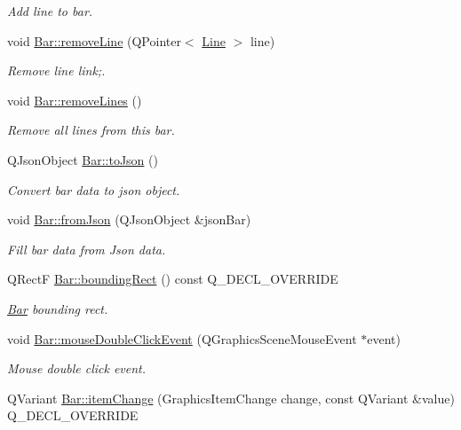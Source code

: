 \begin{DoxyCompactItemize}
\begin{DoxyCompactList}\small\item\em Add line to bar. \end{DoxyCompactList}\item 
void \hyperlink{group___models_gaec9faaf687415c27cd1d0527e1b94504}{Bar\+::remove\+Line} (Q\+Pointer$<$ \hyperlink{class_line}{Line} $>$ line)
\begin{DoxyCompactList}\small\item\em Remove line link;. \end{DoxyCompactList}\item 
void \hyperlink{group___models_ga4ea1a2074cb45968d80d6add571884a4}{Bar\+::remove\+Lines} ()
\begin{DoxyCompactList}\small\item\em Remove all lines from this bar. \end{DoxyCompactList}\item 
Q\+Json\+Object \hyperlink{group___models_ga3eb84c42b687db6cd98e11b8bd38c86e}{Bar\+::to\+Json} ()
\begin{DoxyCompactList}\small\item\em Convert bar data to json object. \end{DoxyCompactList}\item 
void \hyperlink{group___models_ga1df62f03dd3a066ceaf6588ba6bb6004}{Bar\+::from\+Json} (Q\+Json\+Object \&json\+Bar)
\begin{DoxyCompactList}\small\item\em Fill bar data from Json data. \end{DoxyCompactList}\item 
Q\+Rect\+F \hyperlink{group___models_ga8279d8109019cc7e139e2023690496be}{Bar\+::bounding\+Rect} () const Q\+\_\+\+D\+E\+C\+L\+\_\+\+O\+V\+E\+R\+R\+I\+D\+E
\begin{DoxyCompactList}\small\item\em \hyperlink{class_bar}{Bar} bounding rect. \end{DoxyCompactList}\item 
void \hyperlink{group___models_ga1945e7b4401fa9ad7475274d9fb12a72}{Bar\+::mouse\+Double\+Click\+Event} (Q\+Graphics\+Scene\+Mouse\+Event $\ast$event)
\begin{DoxyCompactList}\small\item\em Mouse double click event. \end{DoxyCompactList}\item 
Q\+Variant \hyperlink{group___models_gad97a82d618ee0c51a9a36e44339c69e6}{Bar\+::item\+Change} (Graphics\+Item\+Change change, const Q\+Variant \&value) Q\+\_\+\+D\+E\+C\+L\+\_\+\+O\+V\+E\+R\+R\+I\+D\+E

\end{DoxyCompactItemize}
